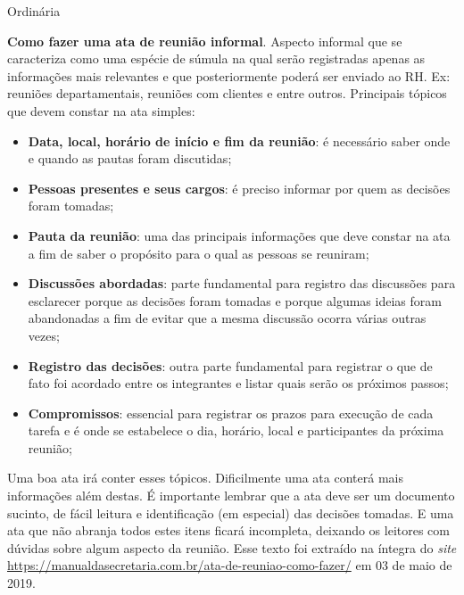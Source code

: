 \documentclass[11pt,twoside]{ata}
\date{03 de maio de 2019}
\begin{document}
\begin{reuniao}{Ordinária} %

\begin{informes}
\item \textbf{Como fazer uma ata de reunião informal}. Aspecto informal que se caracteriza como uma espécie de súmula na qual serão registradas apenas as informações mais relevantes e que posteriormente poderá ser enviado ao RH. Ex: reuniões departamentais, reuniões com clientes e entre outros. Principais tópicos que devem constar na ata simples:
\begin{itemize}
    \item \textbf{Data, local, horário de início e fim da reunião}: é necessário saber onde e quando as pautas foram discutidas;
    \item \textbf{Pessoas presentes e seus cargos}: é preciso informar por quem as decisões foram tomadas;
    \item \textbf{Pauta da reunião}: uma das principais informações que deve constar na ata a fim de saber o propósito para o qual as pessoas se reuniram;
    \item \textbf{Discussões abordadas}: parte fundamental para registro das discussões para esclarecer porque as decisões foram tomadas e porque algumas ideias foram abandonadas a fim de evitar que a mesma discussão ocorra várias outras vezes;
    \item \textbf{Registro das decisões}: outra parte fundamental para registrar o que de fato foi acordado entre os integrantes e listar quais serão os próximos passos;
    \item \textbf{Compromissos}: essencial para registrar os prazos para execução de cada tarefa e é onde se estabelece o dia, horário, local e participantes da próxima reunião;
\end{itemize}
Uma boa ata irá conter esses tópicos. Dificilmente uma ata conterá mais informações além destas. É importante lembrar que a ata deve ser um documento sucinto, de fácil leitura e identificação (em especial) das decisões tomadas. E uma ata que não abranja todos estes itens ficará incompleta, deixando os leitores com dúvidas sobre algum aspecto da reunião. Esse texto foi extraído na íntegra do \textit{site} \url{https://manualdasecretaria.com.br/ata-de-reuniao-como-fazer/} em 03 de maio de 2019.

\item
{}


\end{informes}
\end{reuniao}
\end{document}
